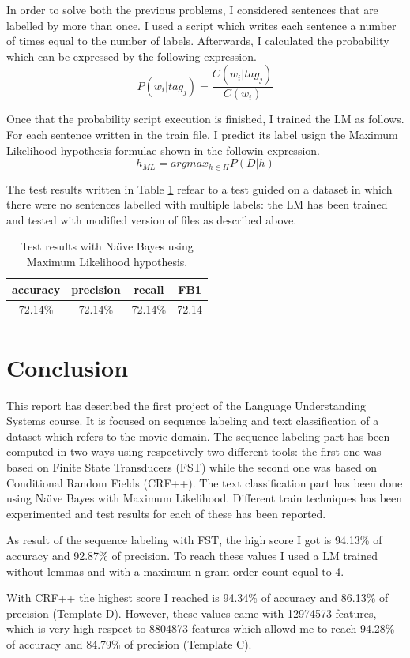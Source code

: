 \documentclass[a4paper,7pt,oneside]{book}
\newcommand\chap[1]{\chapter*{#1}\addcontentsline{toc}{chapter}{\protect\numberline{}#1}}
\begin{document}
\noindent
In order to solve both the previous problems, I considered sentences that are labelled by more than once. I used a script which writes each sentence a number of times equal to the number of labels. Afterwards, I calculated the probability which can be expressed by the following expression.
\[ P(w_i | tag_j) = \frac{C(w_i | tag_j)}{C(w_i)} \]

\noindent
Once that the probability script execution is finished, I trained the LM as follows. For each sentence written in the train file, I predict its label usign the Maximum Likelihood hypothesis formulae shown in the followin expression.
\[ h_{ML} = arg max_{h \in H} P(D|h) \]

\noindent
The test results written in Table \ref{table:bayes_results_max_like} refear to a test guided on a dataset in which there were no sentences labelled with multiple labels: the LM has been trained and tested with modified version of files as described above.

\begin{table}[h!]
\small
	\begin{center}
	\begin{tabular}{|c|c|c|c|}
		\hline
		accuracy & precision & recall & FB1 \\ \hline
		72.14\% & 72.14\% & 72.14\% & 72.14 \\ \hline
	\end{tabular}
	\caption{Test results with Na\"{\i}ve Bayes using Maximum Likelihood hypothesis.}
	\label{table:bayes_results_max_like}
	\end{center}
\end{table}

\chap{Conclusion}

This report has described the first project of the Language Understanding Systems course. It is focused on sequence labeling and text classification of a dataset which refers to the movie domain. The sequence labeling part has been computed in two ways using respectively two different tools: the first one was based on Finite State Transducers (FST) while the second one was based on Conditional Random Fields (CRF++). The text classification part has been done using Na\"{\i}ve Bayes with Maximum Likelihood. Different train techniques has been experimented and test results for each of these has been reported.

As result of the sequence labeling with FST, the high score I got is 94.13\% of accuracy and 92.87\% of precision. To reach these values I used a LM trained without lemmas and with a maximum n-gram order count equal to 4.

With CRF++ the highest score I reached is 94.34\% of accuracy and 86.13\% of precision (Template D). However, these values came with 12974573 features, which is very high respect to 8804873 features which allowd me to reach 94.28\% of accuracy and 84.79\% of precision (Template C).
\end{document}
